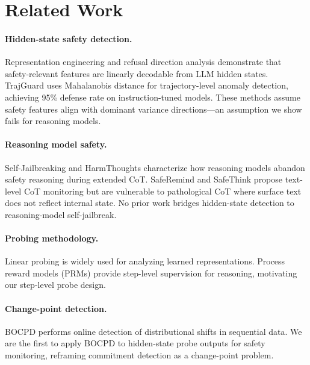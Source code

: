 \documentclass[11pt,a4paper]{article}
\begin{document}
\section{Related Work}
\label{sec:related}

\paragraph{Hidden-state safety detection.} Representation engineering \cite{zou2023representation} and refusal direction analysis \cite{arditi2024refusal} demonstrate that safety-relevant features are linearly decodable from LLM hidden states. TrajGuard \cite{zou2024improving} uses Mahalanobis distance for trajectory-level anomaly detection, achieving 95\% defense rate on instruction-tuned models. These methods assume safety features align with dominant variance directions---an assumption we show fails for reasoning models.

\paragraph{Reasoning model safety.} Self-Jailbreaking \cite{jiang2025harmthoughts} and HarmThoughts characterize how reasoning models abandon safety reasoning during extended CoT. SafeRemind and SafeThink propose text-level CoT monitoring but are vulnerable to pathological CoT where surface text does not reflect internal state. No prior work bridges hidden-state detection to reasoning-model self-jailbreak.

\paragraph{Probing methodology.} Linear probing \cite{hewitt2019structural} is widely used for analyzing learned representations. Process reward models (PRMs) \cite{lightman2023lets} provide step-level supervision for reasoning, motivating our step-level probe design.

\paragraph{Change-point detection.} BOCPD \cite{adams2007bayesian} performs online detection of distributional shifts in sequential data. We are the first to apply BOCPD to hidden-state probe outputs for safety monitoring, reframing commitment detection as a change-point problem.
\end{document}

